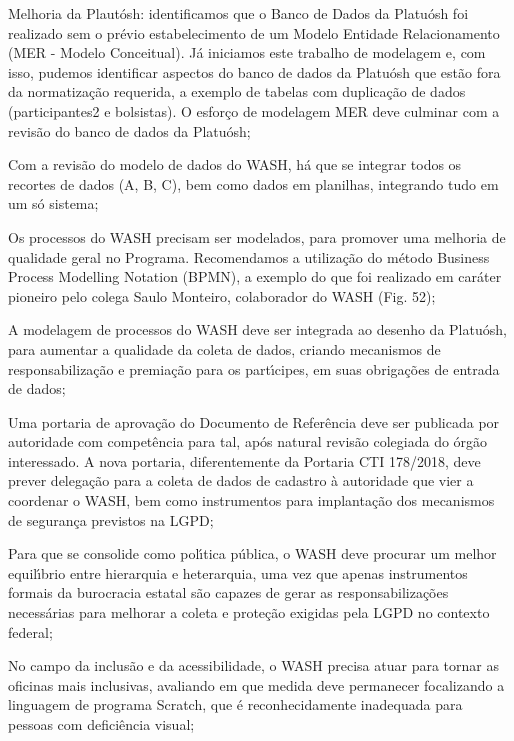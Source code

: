 \documentclass[
12pt,		%
openright,	%
twoside,  %
a4paper,			%
chapter=TITLE,		%
english,			%
french,				%
spanish,			%
brazil				%
]{USPSC-classe/USPSC}
\begin{document}
\begin{alineas}
\item Melhoria da Plaut\'osh: identificamos que o Banco de Dados da Platu\'osh foi realizado sem o pr\'evio estabelecimento de um Modelo Entidade Relacionamento (MER - Modelo Conceitual). J\'a iniciamos este trabalho de modelagem e, com isso, pudemos identificar aspectos do banco de dados da Platu\'osh que est\~ao fora da normatiza\c{c}\~ao requerida, a exemplo de tabelas com duplica\c{c}\~ao de dados (participantes2 e bolsistas). O esfor\c{c}o de modelagem MER deve culminar com a revis\~ao do banco de dados da Platu\'osh;
\item Com a revis\~ao do modelo de dados do WASH, h\'a que se integrar todos os recortes de dados (A, B, C), bem como dados em planilhas, integrando tudo em um s\'o sistema;
\item Os processos do WASH precisam ser modelados, para promover uma melhoria de qualidade geral no Programa. Recomendamos a utiliza\c{c}\~ao do m\'etodo Business Process Modelling Notation (BPMN), a exemplo do que foi realizado em car\'ater pioneiro pelo colega Saulo Monteiro, colaborador do WASH (Fig. 52);
\item A modelagem de processos do WASH deve ser integrada ao desenho da Platu\'osh, para aumentar a qualidade da coleta de dados, criando mecanismos de responsabiliza\c{c}\~ao e premia\c{c}\~ao para os part\'{\i}cipes, em suas obriga\c{c}\~oes de entrada de dados;
\item Uma portaria de aprova\c{c}\~ao do Documento de Refer\^encia deve ser publicada por autoridade com compet\^encia para tal, ap\'os natural revis\~ao colegiada do \'org\~ao interessado. A nova portaria, diferentemente da Portaria CTI 178/2018, deve prever delega\c{c}\~ao para a coleta de dados de cadastro \`a autoridade que vier a coordenar o WASH, bem como instrumentos para implanta\c{c}\~ao dos mecanismos de seguran\c{c}a previstos na LGPD;
\item Para que se consolide como pol\'{\i}tica p\'ublica, o WASH deve procurar um melhor equil\'{\i}brio entre hierarquia e heterarquia, uma vez que apenas instrumentos formais da burocracia estatal s\~ao capazes de gerar as responsabiliza\c{c}\~oes necess\'arias para melhorar a coleta e prote\c{c}\~ao exigidas pela LGPD no contexto federal;
\item No campo da inclus\~ao e da acessibilidade, o WASH precisa atuar para tornar as oficinas mais inclusivas, avaliando em que medida deve permanecer focalizando a linguagem de programa Scratch, que \'e reconhecidamente inadequada para pessoas com defici\^encia visual;

\end{alineas}
\end{document}
